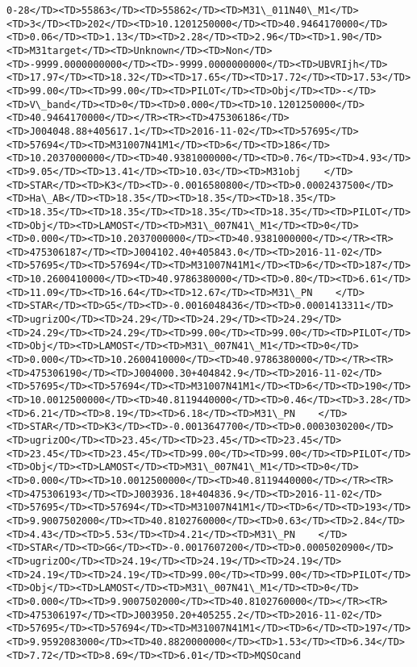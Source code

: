 \documentclass[11pt]{article}
\begin{document}
\begin{Verbatim}[commandchars=\\\{\}]
0-28</TD><TD>55863</TD><TD>55862</TD><TD>M31\_011N40\_M1</TD><TD>3</TD><TD>202</TD><TD>10.1201250000</TD><TD>40.9464170000</TD><TD>0.06</TD><TD>1.13</TD><TD>2.28</TD><TD>2.96</TD><TD>1.90</TD><TD>M31target</TD><TD>Unknown</TD><TD>Non</TD><TD>-9999.0000000000</TD><TD>-9999.0000000000</TD><TD>UBVRIjh</TD><TD>17.97</TD><TD>18.32</TD><TD>17.65</TD><TD>17.72</TD><TD>17.53</TD><TD>99.00</TD><TD>99.00</TD><TD>PILOT</TD><TD>Obj</TD><TD>-</TD><TD>V\_band</TD><TD>0</TD><TD>0.000</TD><TD>10.1201250000</TD><TD>40.9464170000</TD></TR><TR><TD>475306186</TD><TD>J004048.88+405617.1</TD><TD>2016-11-02</TD><TD>57695</TD><TD>57694</TD><TD>M31007N41M1</TD><TD>6</TD><TD>186</TD><TD>10.2037000000</TD><TD>40.9381000000</TD><TD>0.76</TD><TD>4.93</TD><TD>9.05</TD><TD>13.41</TD><TD>10.03</TD><TD>M31obj    </TD><TD>STAR</TD><TD>K3</TD><TD>-0.0016580800</TD><TD>0.0002437500</TD><TD>Ha\_AB</TD><TD>18.35</TD><TD>18.35</TD><TD>18.35</TD><TD>18.35</TD><TD>18.35</TD><TD>18.35</TD><TD>18.35</TD><TD>PILOT</TD><TD>Obj</TD><TD>LAMOST</TD><TD>M31\_007N41\_M1</TD><TD>0</TD><TD>0.000</TD><TD>10.2037000000</TD><TD>40.9381000000</TD></TR><TR><TD>475306187</TD><TD>J004102.40+405843.0</TD><TD>2016-11-02</TD><TD>57695</TD><TD>57694</TD><TD>M31007N41M1</TD><TD>6</TD><TD>187</TD><TD>10.2600410000</TD><TD>40.9786380000</TD><TD>0.80</TD><TD>6.61</TD><TD>11.09</TD><TD>16.64</TD><TD>12.67</TD><TD>M31\_PN    </TD><TD>STAR</TD><TD>G5</TD><TD>-0.0016048436</TD><TD>0.0001413311</TD><TD>ugrizOO</TD><TD>24.29</TD><TD>24.29</TD><TD>24.29</TD><TD>24.29</TD><TD>24.29</TD><TD>99.00</TD><TD>99.00</TD><TD>PILOT</TD><TD>Obj</TD><TD>LAMOST</TD><TD>M31\_007N41\_M1</TD><TD>0</TD><TD>0.000</TD><TD>10.2600410000</TD><TD>40.9786380000</TD></TR><TR><TD>475306190</TD><TD>J004000.30+404842.9</TD><TD>2016-11-02</TD><TD>57695</TD><TD>57694</TD><TD>M31007N41M1</TD><TD>6</TD><TD>190</TD><TD>10.0012500000</TD><TD>40.8119440000</TD><TD>0.46</TD><TD>3.28</TD><TD>6.21</TD><TD>8.19</TD><TD>6.18</TD><TD>M31\_PN    </TD><TD>STAR</TD><TD>K3</TD><TD>-0.0013647700</TD><TD>0.0003030200</TD><TD>ugrizOO</TD><TD>23.45</TD><TD>23.45</TD><TD>23.45</TD><TD>23.45</TD><TD>23.45</TD><TD>99.00</TD><TD>99.00</TD><TD>PILOT</TD><TD>Obj</TD><TD>LAMOST</TD><TD>M31\_007N41\_M1</TD><TD>0</TD><TD>0.000</TD><TD>10.0012500000</TD><TD>40.8119440000</TD></TR><TR><TD>475306193</TD><TD>J003936.18+404836.9</TD><TD>2016-11-02</TD><TD>57695</TD><TD>57694</TD><TD>M31007N41M1</TD><TD>6</TD><TD>193</TD><TD>9.9007502000</TD><TD>40.8102760000</TD><TD>0.63</TD><TD>2.84</TD><TD>4.43</TD><TD>5.53</TD><TD>4.21</TD><TD>M31\_PN    </TD><TD>STAR</TD><TD>G6</TD><TD>-0.0017607200</TD><TD>0.0005020900</TD><TD>ugrizOO</TD><TD>24.19</TD><TD>24.19</TD><TD>24.19</TD><TD>24.19</TD><TD>24.19</TD><TD>99.00</TD><TD>99.00</TD><TD>PILOT</TD><TD>Obj</TD><TD>LAMOST</TD><TD>M31\_007N41\_M1</TD><TD>0</TD><TD>0.000</TD><TD>9.9007502000</TD><TD>40.8102760000</TD></TR><TR><TD>475306197</TD><TD>J003950.20+405255.2</TD><TD>2016-11-02</TD><TD>57695</TD><TD>57694</TD><TD>M31007N41M1</TD><TD>6</TD><TD>197</TD><TD>9.9592083000</TD><TD>40.8820000000</TD><TD>1.53</TD><TD>6.34</TD><TD>7.72</TD><TD>8.69</TD><TD>6.01</TD><TD>MQSOcand  
\end{Verbatim}
\end{document}
